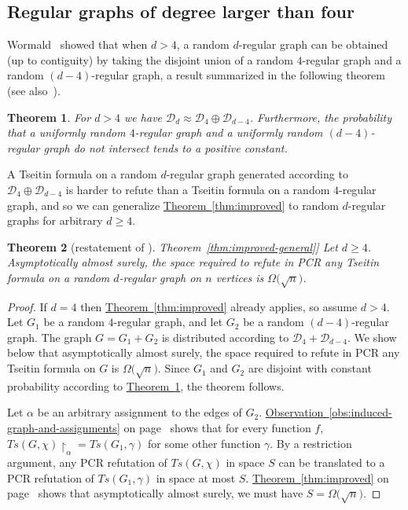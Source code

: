 \documentclass[11pt]{article}
\numberwithin{equation}{section}
\newtheorem{theorem}{Theorem}[section]
\theoremstyle{definition}
\theoremstyle{plain}
\newcommand{\expref}[2]{\hyperref[#2]{#1~\ref{#2}}}
\theoremstyle{plain}
\theoremstyle{definition}
\newcommand{\refth}[1]{\expref{Theorem}{#1}}
\newcommand{\refthP}[1]{\expref{Theorem}{#1} on page~\pageref{#1}}
\newcommand{\refobsP}[1]{\expref{Observation}{#1} on page~\pageref{#1}}
\newcommand{\Bigomega}[1]{\Omega \bigl( #1 \bigr)}
\newcommand{\restrict}[2]{{{#1}\!\!\upharpoonright_{#2}}}
\newcommand{\formulaformat}[1]{\mathit{#1}}
\newcommand{\tseitinnot}[2]{\formulaformat{Ts}({#1,#2})}
\newcommand{\probspace}{\mathcal}
\newcommand{\psReg}{\probspace{D}}
\newcommand{\tseitincharge}{\chi}
\begin{document}
%

\subsection{Regular graphs of degree larger than four}
Wormald~\cite[Corollary 4.17]{W} showed that when $d > 4$, a random $d$-regular graph can be obtained (up to contiguity) by taking the disjoint union of a random $4$-regular graph and a random $(d-4)$-regular graph, a result summarized in the following theorem (see also~\cite[Corollary 9.44]{JLR}).

\begin{theorem}\label{th:regular}
 For $d > 4$ we have $\psReg_d \approx \psReg_4 \oplus \psReg_{d-4}$. Furthermore, the probability that a uniformly random $4$-regular graph and a uniformly random $(d-4)$-regular graph do not intersect tends to a positive constant.
\end{theorem}

A Tseitin formula on a random $d$-regular graph generated according to $\psReg_4 \oplus \psReg_{d-4}$ is harder to refute than a Tseitin formula on a random $4$-regular graph, and so we can generalize \refth{thm:improved} to random $d$-regular graphs for arbitrary $d \geq 4$.

\begin{theorem}[restatement of \refth{thm:improved-general}]
 Let $d \geq 4$. Asymptotically almost surely, the space required to refute in PCR any Tseitin formula on a random $d$-regular graph on $n$ vertices is $\Bigomega{\sqrt{n}}$.
\end{theorem}
\begin{proof}
 If $d = 4$ then \refth{thm:improved} already applies, so assume $d > 4$.
 Let $G_1$ be a random $4$-regular graph, and let $G_2$ be a random $(d-4)$-regular graph. The graph $G = G_1 + G_2$ is distributed according to $\psReg_4 + \psReg_{d-4}$. We show below that asymptotically almost surely, the space required to refute in PCR any Tseitin formula on $G$ is $\Bigomega{\sqrt{n}}$. Since $G_1$ and $G_2$ are disjoint with constant probability according to \refth{th:regular}, the theorem follows.

 Let $\alpha$ be an arbitrary assignment to the edges of $G_2$. \refobsP{obs:induced-graph-and-assignments} shows that for every function $f$, $\restrict{\tseitinnot{G}{\tseitincharge}}{\alpha} = \tseitinnot{G_1}{\gamma}$ for some other function $\gamma$. By a restriction argument, any PCR refutation of $\tseitinnot{G}{\tseitincharge}$ in space $S$ can be translated to a PCR refutation of $\tseitinnot{G_1}{\gamma}$ in space at most $S$. \refthP{thm:improved} shows that asymptotically almost surely, we must have $S  = \Bigomega{\sqrt{n}}$.
\end{proof}
\end{document}
